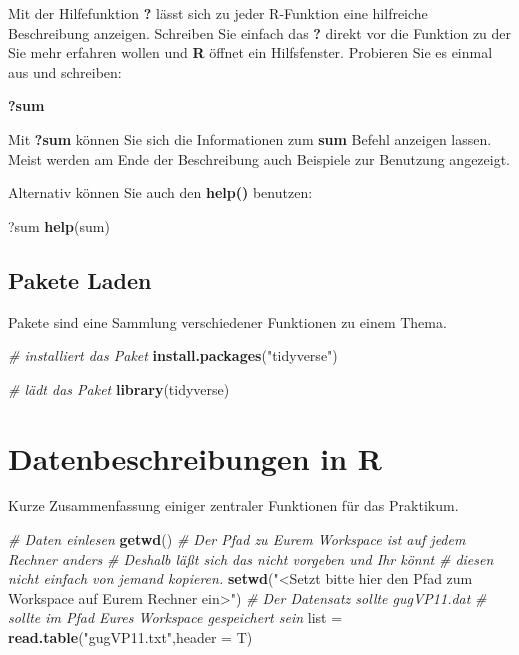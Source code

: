 \documentclass[]{book}
\newenvironment{Shaded}{\begin{snugshade}}{\end{snugshade}}
\newcommand{\KeywordTok}[1]{\textcolor[rgb]{0.13,0.29,0.53}{\textbf{#1}}}
\newcommand{\DataTypeTok}[1]{\textcolor[rgb]{0.13,0.29,0.53}{#1}}
\newcommand{\StringTok}[1]{\textcolor[rgb]{0.31,0.60,0.02}{#1}}
\newcommand{\CommentTok}[1]{\textcolor[rgb]{0.56,0.35,0.01}{\textit{#1}}}
\newcommand{\NormalTok}[1]{#1}
\begin{document}
Mit der Hilfefunktion \textbf{?} lässt sich zu jeder R-Funktion eine
hilfreiche Beschreibung anzeigen. Schreiben Sie einfach das \textbf{?}
direkt vor die Funktion zu der Sie mehr erfahren wollen und \textbf{R}
öffnet ein Hilfsfenster. Probieren Sie es einmal aus und schreiben:

\textbf{?sum}

Mit \textbf{?sum} können Sie sich die Informationen zum \textbf{sum}
Befehl anzeigen lassen. Meist werden am Ende der Beschreibung auch
Beispiele zur Benutzung angezeigt.

Alternativ können Sie auch den \textbf{help()} benutzen:

\begin{Shaded}
\begin{Highlighting}[]
\NormalTok{?sum}
\KeywordTok{help}\NormalTok{(sum)}
\end{Highlighting}
\end{Shaded}

\section{Pakete Laden}\label{pakete-laden}

Pakete sind eine Sammlung verschiedener Funktionen zu einem Thema.

\begin{Shaded}
\begin{Highlighting}[]
\CommentTok{# installiert das Paket}
\KeywordTok{install.packages}\NormalTok{(}\StringTok{"tidyverse"}\NormalTok{)}

\CommentTok{# lädt das Paket}
\KeywordTok{library}\NormalTok{(tidyverse)}
\end{Highlighting}
\end{Shaded}

\chapter{Datenbeschreibungen in R}\label{datenbeschreibungen-in-r}

Kurze Zusammenfassung einiger zentraler Funktionen für das Praktikum.

\begin{Shaded}
\begin{Highlighting}[]
\CommentTok{# Daten einlesen}
\KeywordTok{getwd}\NormalTok{()}
\CommentTok{# Der Pfad zu Eurem Workspace ist auf jedem Rechner anders}
\CommentTok{# Deshalb läßt sich das nicht vorgeben und Ihr könnt}
\CommentTok{# diesen nicht einfach von jemand kopieren.}
\KeywordTok{setwd}\NormalTok{(}\StringTok{"<Setzt bitte hier den Pfad zum Workspace auf Eurem Rechner ein>"}\NormalTok{)}
\CommentTok{# Der Datensatz sollte gugVP11.dat }
\CommentTok{# sollte im Pfad Eures Workspace gespeichert sein}
\NormalTok{list =}\StringTok{ }\KeywordTok{read.table}\NormalTok{(}\StringTok{"gugVP11.txt"}\NormalTok{,}\DataTypeTok{header =}\NormalTok{ T)}
\end{Highlighting}
\end{Shaded}
\end{document}
